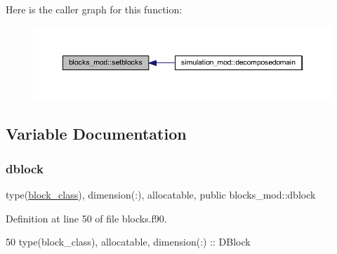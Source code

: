 Here is the caller graph for this function\+:\nopagebreak
\begin{figure}[H]
\begin{center}
\leavevmode
\includegraphics[width=350pt]{namespaceblocks__mod_a8f5a5d9e6cfd16cfd1b179092a204696_icgraph}
\end{center}
\end{figure}


\subsection{Variable Documentation}
\mbox{\label{namespaceblocks__mod_ac8ad6e3cf7a812f95dadb592336aca50}} 
\subsubsection{\texorpdfstring{dblock}{dblock}}
{\footnotesize\ttfamily type(\mbox{\hyperlink{structblocks__mod_1_1block__class}{block\+\_\+class}}), dimension(\+:), allocatable, public blocks\+\_\+mod\+::dblock}



Definition at line 50 of file blocks.\+f90.


\begin{DoxyCode}
50     \textcolor{keywordtype}{type}(block\_class), \textcolor{keywordtype}{allocatable}, \textcolor{keywordtype}{dimension(:)} :: DBlock
\end{DoxyCode}
